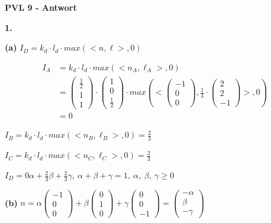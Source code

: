 \documentclass[fleqn]{article}
\begin{document}
\noindent\textbf{PVL 9 - Antwort}

\indent\textbf{1.}

\indent\indent\textbf{(a)}
$I_D = k_d \cdot l_d \cdot max(<n, \ell  >,0)$

\begin{equation}
    \begin{split}
            I_A & = k_d \cdot l_d \cdot max(<n_A,\ell _A>,0)\\
    &= \begin{pmatrix}\frac{1}{2} \\ 1 \\ 1 \end{pmatrix} \cdot \begin{pmatrix} 1 \\ 0 \\ \frac{1}{2} \end{pmatrix} \cdot max(<\begin{pmatrix} -1 \\ 0 \\ 0 \end{pmatrix},\frac{1}{3}\cdot \begin{pmatrix} 2\\ 2 \\ -1 \end{pmatrix}>,0) \\
        &=0
    \end{split}
\end{equation}

\qquad $I_B = k_d\cdot l_d\cdot max(<n_B,\ell _B>,0) = \frac{2}{3}$

\qquad $I_C = k_d\cdot l_d\cdot max(<n_C,\ell _C>,0) = \frac{2}{3}$

\qquad $I_D = 0\alpha  + \frac{2}{3}\beta + \frac{2}{3}\gamma,\ \alpha + \beta+\gamma = 1,\ \alpha ,\ \beta,\ \gamma \geq 0$

\indent\indent\textbf{(b)}
$n = \alpha\begin{pmatrix}-1\\0\\0 \end{pmatrix} + \beta\begin{pmatrix}0\\1\\0 \end{pmatrix} + \gamma \begin{pmatrix}0\\0\\-1 \end{pmatrix}=\begin{pmatrix}-\alpha\\\beta\\-\gamma \end{pmatrix}$ 
\end{document}
